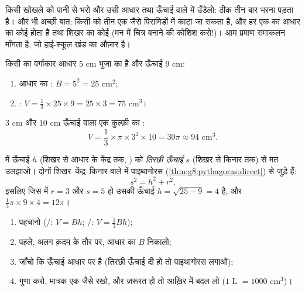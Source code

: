 \begin{remark}[एक तिहाई क्यों?]
किसी खोखले  को पानी से भरो और उसी आधार तथा ऊँचाई वाले
 में उँडेलो: ठीक तीन बार भरना पड़ता है। और भी अच्छी बात: किसी
 को तीन एक जैसे पिरामिडों में काटा जा सकता है, और हर एक का आधार 
का कोई  होता है तथा शिखर  का कोई  (मन में चित्र बनाने की
कोशिश करो!)। आम प्रमाण समाकलन माँगता है, जो हाई-स्कूल खंड का औज़ार है।
\end{remark}

\begin{example}\label{ex:g8:solids:volume}
किसी  का वर्गाकार आधार $5$ cm भुजा का है और ऊँचाई $9$ cm:
\begin{enumerate}
  \item आधार का : $B = 5^2 = 25$ cm$^2$;
  \item {}: $V = \frac13 \times 25 \times 9 = 25 \times 3 = 75$
        cm$^3$।
\end{enumerate}
$3$ cm  और $10$ cm ऊँचाई वाला एक कुल्फ़ी का :
\[
V = \frac13 \times \pi \times 3^2 \times 10 = 30\pi \approx 94
\text{ cm}^3 .
\]
\end{example}

\begin{example}[ऊँचाई से सावधान]\label{ex:g8:solids:slant}
 में ऊँचाई $h$ (शिखर से आधार के केंद्र तक, ) को \emph{तिरछी
ऊँचाई} $s$ (शिखर से किनार तक) से मत उलझाओ। दोनों शिखर--केंद्र--किनार
वाले  में पाइथागोरस
(\cref{thm:g8:pythagoras:direct}) से जुड़े हैं:
\[
s^2 = h^2 + r^2 .
\]
इसलिए जिस  में $r = 3$ और $s = 5$ हो उसकी ऊँचाई
$h = \sqrt{25 - 9} = 4$ है, और 
$\frac13 \pi \times 9 \times 4 = 12\pi$।
\end{example}

\begin{method}\label{met:g8:solids:method}
\begin{enumerate}
  \item {} पहचानो (/: $V = Bh$; /:
        $V = \frac13 Bh$);
  \item पहले, अलग क़दम के तौर पर, आधार का  $B$ निकालो;
  \item जाँचो कि ऊँचाई आधार पर  है (तिरछी ऊँचाई दी हो तो
        पाइथागोरस लगाओ);
  \item गुणा करो, मात्रक एक जैसे रखो, और ज़रूरत हो तो आख़िर में बदल
        लो ($1$ L $= 1000$ cm$^3$)।
\end{enumerate}
\end{method}

